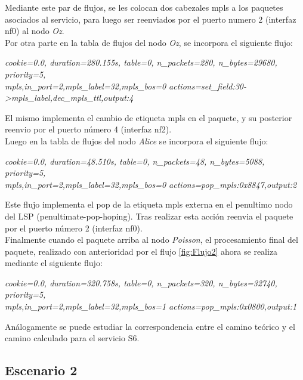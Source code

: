 Mediante este par de flujos, se les colocan dos cabezales mpls a los paquetes asociados al servicio, para luego ser reenviados por el puerto numero 2 (interfaz nf0) al nodo \textit{Oz}.\\

Por otra parte en la tabla de flujos del nodo \textit{Oz}, se incorpora el siguiente flujo:

\begin{center}
\textit{cookie=0.0, duration=280.155s, table=0, n\_packets=280, n\_bytes=29680, priority=5, \\
mpls,in\_port=2,mpls\_label=32,mpls\_bos=0 actions=set\_field:30->mpls\_label,dec\_mpls\_ttl,output:4 }
\end{center}

El mismo implementa el cambio de etiqueta mpls en el paquete, y su posterior reenvio por el puerto n\'umero 4 (interfaz nf2).\\

Luego en la tabla de flujos del nodo \textit{Alice} se incorpora el siguiente flujo:

\begin{center}
\textit{cookie=0.0, duration=48.510s, table=0, n\_packets=48, n\_bytes=5088, priority=5, \\
mpls,in\_port=2,mpls\_label=32,mpls\_bos=0 actions=pop\_mpls:0x8847,output:2 }
\end{center}

Este flujo implementa el pop de la etiqueta mpls externa en el penultimo nodo del LSP (penultimate-pop-hoping). Tras realizar esta acci\'on reenvia el paquete por el puerto n\'umero 2 (interfaz nf0).\\

Finalmente cuando el paquete arriba al nodo \textit{Poisson}, el procesamiento final del paquete, realizado con anterioridad por el flujo \ref{fig:Flujo2} ahora se realiza mediante el siguiente flujo: 

\begin{center}
\textit{cookie=0.0, duration=320.758s, table=0, n\_packets=320, n\_bytes=32740, priority=5, \\
mpls,in\_port=2,mpls\_label=32,mpls\_bos=1 actions=pop\_mpls:0x0800,output:1 }
\end{center}

Análogamente se puede estudiar la correspondencia entre el camino te\'orico y el camino calculado para el servicio S6.
 
\subsection{Escenario 2}

